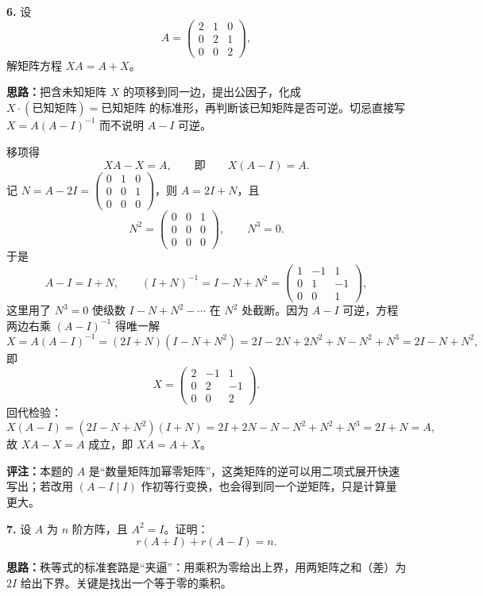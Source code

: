 \textbf{6.} 设
\[
A=\begin{pmatrix}
2&1&0\\
0&2&1\\
0&0&2
\end{pmatrix},
\]
解矩阵方程 \(XA=A+X\)。

\ifshowsolutions%
\textbf{思路：}把含未知矩阵 \(X\) 的项移到同一边，提出公因子，化成 \(X\cdot(\text{已知矩阵})=\text{已知矩阵}\) 的标准形，再判断该已知矩阵是否可逆。切忌直接写 \(X=A(A-I)^{-1}\) 而不说明 \(A-I\) 可逆。

移项得
\[
XA-X=A,\qquad\text{即}\qquad X(A-I)=A.
\]
记 \(N=A-2I=\begin{pmatrix}0&1&0\\0&0&1\\0&0&0\end{pmatrix}\)，则 \(A=2I+N\)，且
\[
N^2=\begin{pmatrix}0&0&1\\0&0&0\\0&0&0\end{pmatrix},\qquad N^3=0.
\]
于是
\[
A-I=I+N,\qquad
(I+N)^{-1}=I-N+N^2
=\begin{pmatrix}
1&-1&1\\
0&1&-1\\
0&0&1
\end{pmatrix},
\]
这里用了 \(N^3=0\) 使级数 \(I-N+N^2-\cdots\) 在 \(N^2\) 处截断。因为 \(A-I\) 可逆，方程两边右乘 \((A-I)^{-1}\) 得唯一解
\[
X=A(A-I)^{-1}=(2I+N)(I-N+N^2)
=2I-2N+2N^2+N-N^2+N^3
=2I-N+N^2,
\]
即
\[
X=\begin{pmatrix}
2&-1&1\\
0&2&-1\\
0&0&2
\end{pmatrix}.
\]
回代检验：
\[
X(A-I)=(2I-N+N^2)(I+N)=2I+2N-N-N^2+N^2+N^3=2I+N=A,
\]
故 \(XA-X=A\) 成立，即 \(XA=A+X\)。

\textbf{评注：}本题的 \(A\) 是“数量矩阵加幂零矩阵”，这类矩阵的逆可以用二项式展开快速写出；若改用 \((A-I\mid I)\) 作初等行变换，也会得到同一个逆矩阵，只是计算量更大。

\else \answerarea[10] \fi%

\textbf{7.} 设 \(A\) 为 \(n\) 阶方阵，且 \(A^2=I\)。证明：
\[
r(A+I)+r(A-I)=n.
\]

\ifshowsolutions%
\textbf{思路：}秩等式的标准套路是“夹逼”：用乘积为零给出上界，用两矩阵之和（差）为 \(2I\) 给出下界。关键是找出一个等于零的乘积。

